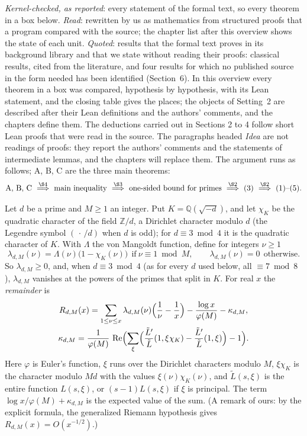  \emph{Kernel-checked, as reported}: every statement of the formal text, so every
theorem in a box below. \emph{Read}: rewritten by us as mathematics from structured proofs that a program compared with the source;
the chapter list after this overview shows the state of each unit. \emph{Quoted}: results that the formal
text proves in its background library and that we state without reading their proofs: classical results, cited
from the literature, and four results for which no published source in the form needed has been identified
(Section~6). In this overview every
theorem in a box was compared, hypothesis by hypothesis, with its Lean statement, and the closing table gives the
places; the objects of Setting~2 are described after their Lean definitions and the authors' comments, and the
chapters define them. The deductions carried out in Sections 2 to 4 follow short Lean proofs that were read in the
source. The paragraphs headed
\emph{Idea} are not readings of proofs: they report the authors' comments and the statements of intermediate lemmas,
and the chapters will replace them. The argument runs as follows; A, B, C are the three main theorems:
\[
\text{A, B, C}\ovto{4}\text{main inequality}\ovto{3}\text{one-sided bound for primes}\ovto{2}\text{(3)}\ovto{2}\text{(1)--(5)}.
\]


 Let $d$ be a prime and $M\ge1$ an integer. Put $K=\mathbb{Q}(\sqrt{-d})$, and let
$\chi_K$ be the quadratic character of the field $\mathbb{Z}/d$, a Dirichlet character modulo $d$ (the Legendre
symbol $(\,\cdot\,/d)$ when $d$ is odd); for $d\equiv 3 \bmod 4$ it is the quadratic character of $K$. With
$\Lambda$ the von Mangoldt function, define for integers $\nu\ge1$
\[
\lambda_{d,M}(\nu)=\Lambda(\nu)\bigl(1-\chi_K(\nu)\bigr)\ \ \text{if}\ \nu\equiv1 \bmod M,\qquad \lambda_{d,M}(\nu)=0\ \ \text{otherwise.}
\]
So $\lambda_{d,M}\ge0$, and, when $d\equiv3\bmod4$ (as for every $d$ used below, all $\equiv7\bmod8$), $\lambda_{d,M}$
vanishes at the powers of the primes that split in $K$. For real $x$ the
\emph{remainder} is
\begin{gather*}
R_{d,M}(x)=\sum_{1\le\nu\le x}\lambda_{d,M}(\nu)\Bigl(\frac1\nu-\frac1x\Bigr)-\frac{\log x}{\varphi(M)}-\kappa_{d,M},\\
\kappa_{d,M}=\frac{1}{\varphi(M)}\,\operatorname{Re}\Bigl(\sum_{\xi}\Bigl(\frac{\tilde L'}{\tilde L}(1,\xi\chi_K)-\frac{\tilde L'}{\tilde L}(1,\xi)\Bigr)-1\Bigr).
\end{gather*}
Here $\varphi$ is Euler's function, $\xi$ runs over the Dirichlet characters modulo $M$, $\xi\chi_K$ is the
character modulo $Md$ with the values $\xi(\nu)\chi_K(\nu)$, and $\tilde L(s,\xi)$ is the
entire function $L(s,\xi)$, or $(s-1)L(s,\xi)$ if $\xi$ is principal. The term $\log x/\varphi(M)+\kappa_{d,M}$ is the
expected value of the sum. (A remark of ours: by the explicit formula, the generalized Riemann hypothesis gives
$R_{d,M}(x)=O(x^{-1/2})$.)

